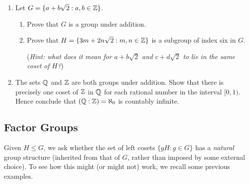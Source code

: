 \begin{exercises}
\begin{enumerate}
			
		\item\label{exs:zsqrt2subgroup} Let $G=\{a+b\sqrt 2:a,b\in\mathbb{Z}\}$.
		\begin{enumerate}
		  \item Prove that $G$ is a group under addition.
		  \item Prove that $H=\{3m+2n\sqrt 2:m,n\in\mathbb{Z}\}$ is a subgroup of index six in $G$.\par
		  (\emph{Hint: what does it mean for $a+b\sqrt 2$ and $c+d\sqrt 2$ to lie in the same coset of $H$?})
		\end{enumerate}
	  
	  \item\label{exs:zqindex} The sets $\mathbb{Q}$ and $\mathbb{Z}$ are both groups under addition. Show that there is precisely one coset of $\mathbb{Z}$ in $\mathbb{Q}$ for each rational number in the interval $[0,1)$. Hence conclude that $(\mathbb{Q}:\mathbb{Z})=\aleph_0$ is countably infinite.
	
	\end{enumerate}
\end{exercises}


\clearpage

\subsection{Factor Groups}\label{sec:factor}

Given $H\le G$, we ask whether the set of left cosets $\{gH:g\in G\}$ has a \emph{natural} group structure (inherited from that of $G$, rather than imposed by some external choice). To see how this might (or might not) work, we recall some previous examples.

